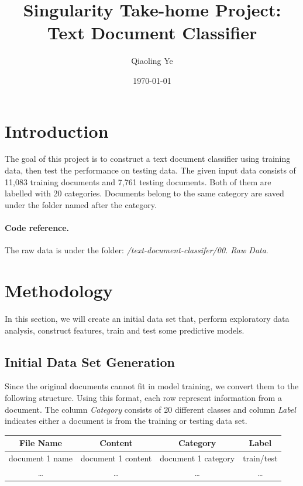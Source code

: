 \documentclass[11pt]{article}
\theoremstyle{remark}
\begin{document}
\title{Singularity Take-home Project: Text Document Classifier}
\author{Qiaoling Ye}
\date{\today}
\maketitle


\section{Introduction}
The goal of this project is to construct a text document classifier using training data,  then test the performance on testing data.
The given input data consists of 11,083 training documents and 7,761 testing documents. 
Both of them are labelled with 20 categories. Documents belong to the same category are saved under the folder named after the category. 

\paragraph{Code reference.}
The raw data is under the folder: {\em/text-document-classifer/00. Raw Data}.

\section{Methodology}

In this section, we will create an initial data set that, perform exploratory data analysis, construct features, train and test some predictive models. 

\subsection{Initial Data Set Generation}

Since the original documents cannot fit in model training, we convert them to the following structure. Using this format, each row represent information from a document. The column {\em Category} consists of 20 different classes and column {\em Label}  indicates either a document is from the training or testing data set.

\begin{center}
\begin{tabular}{ |c|c|c|c| } 
 \hline
File Name & Content & Category & Label \\
\hline
document 1 name & document 1 content & document 1 category & train/test \\
\ldots & \ldots & \ldots & \ldots \\
 \hline
\end{tabular}
\end{center}
\end{document}
